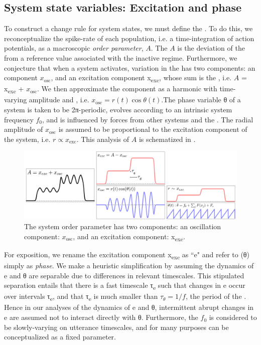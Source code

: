 \subsection{System state variables: Excitation and phase}

To construct a change rule for system states, we must define the . To do this, we reconceptualize the spike-rate of each population, i.e. a time-integration of action potentials, as a macroscopic \textit{order parameter}, $A$. The  $A$ is the deviation of the  from a reference value associated with the inactive regime. Furthermore, we conjecture that when a system activates, variation in the  has two components: an  component $x_{\text{osc}}$, and an excitation component x\textsubscript{exc}, whose sum is the , i.e. $A$ = x\textsubscript{exc} + $x_{\text{osc}}$. We then approximate the  component as a harmonic  with time-varying amplitude and , i.e. $x_{\text{osc}} = r(t) \cos θ(t)$.The phase variable θ of a system is taken to be 2π{}-periodic, evolves according to an intrinsic system frequency $f_0$, and is influenced by forces from other systems and the . The radial amplitude of $x_{\text{osc}}$ is assumed to be proportional to the excitation component of the system, i.e. $r \propto x_{\text{exc}}$. This analysis of $A$ is schematized in {}.  

  
\begin{figure}
\includegraphics[width=\textwidth]{figures/Tilsen-img12.png}
\caption{The system order parameter has two components: an oscillation component: $x_{\text{osc}}$, and an excitation component: x\textsubscript{exc}.}
\label{fig:2:5}
\end{figure}
 

  For exposition, we rename the excitation component x\textsubscript{exc} as ``e" and refer to  (θ) simply as \textit{phase}. We make a heuristic simplification by assuming the dynamics of e and θ are separable due to differences in relevant timescales. This stipulated separation entails that there is a fast timescale τ\textsubscript{e} such that changes in e occur over intervals τ\textsubscript{e}, and that τ\textsubscript{e} is much smaller than $τ_{θ} = 1/f$, the period of the . Hence in our analyses of the dynamics of e and θ, intermittent abrupt changes in e are assumed not to interact directly with θ. Furthermore, the  $f_0$ is considered to be slowly-varying on utterance timescales, and for many purposes can be conceptualized as a fixed parameter. 

